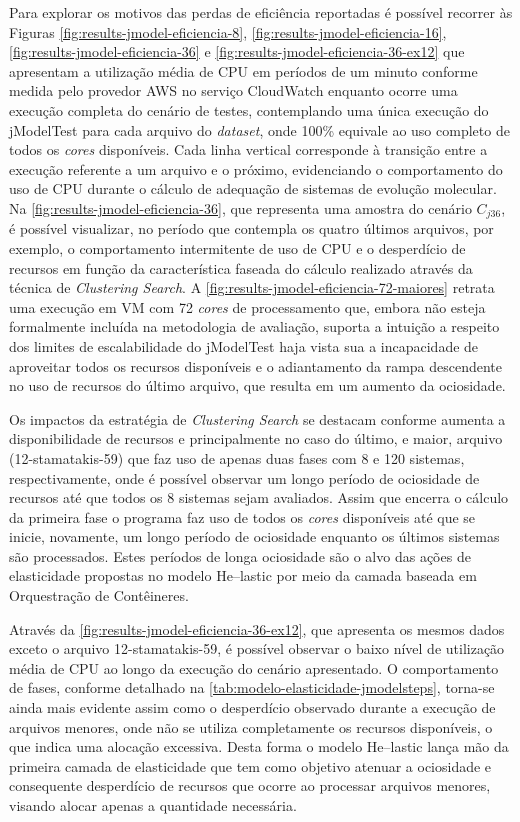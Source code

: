 \documentclass[english,brazilian]{UNISINOSmonografia} %
\begin{document}
Para explorar os motivos das perdas de eficiência reportadas é possível recorrer às Figuras \ref{fig:results-jmodel-eficiencia-8}, \ref{fig:results-jmodel-eficiencia-16}, \ref{fig:results-jmodel-eficiencia-36} e \ref{fig:results-jmodel-eficiencia-36-ex12} que
apresentam a utilização média de CPU em períodos de um minuto conforme medida pelo provedor AWS no serviço CloudWatch enquanto ocorre uma execução completa do cenário de testes, contemplando uma única execução do jModelTest para cada arquivo do \textit{dataset}, onde 100\% equivale ao uso completo de todos os \textit{cores} disponíveis.
%
Cada linha vertical corresponde à transição entre a execução referente a um arquivo e o próximo, evidenciando o comportamento do uso de CPU durante o cálculo de adequação de sistemas de evolução molecular.
%
Na \autoref{fig:results-jmodel-eficiencia-36}, que representa uma amostra do cenário $C_{j36}$, é possível visualizar, no período que contempla os quatro últimos arquivos, por exemplo, o comportamento intermitente de uso de CPU e o desperdício de recursos em função da característica faseada do cálculo realizado através da técnica de \textit{Clustering Search}.
%
A \autoref{fig:results-jmodel-eficiencia-72-maiores} retrata uma execução em VM com 72 \textit{cores} de processamento que, embora não esteja formalmente incluída na metodologia de avaliação, suporta a intuição a respeito dos limites de escalabilidade do jModelTest haja vista sua a incapacidade de aproveitar todos os recursos disponíveis e o adiantamento da rampa descendente no uso de recursos do último arquivo, que resulta em um aumento da ociosidade. 



Os impactos da estratégia de \textit{Clustering Search} se destacam conforme aumenta a disponibilidade de recursos e principalmente no caso do último, e maior, arquivo (12-stamatakis-59) que faz uso de apenas duas fases com 8 e 120 sistemas, respectivamente, onde é possível observar um longo período de ociosidade de recursos até que todos os 8 sistemas sejam avaliados.
%
Assim que encerra o cálculo da primeira fase o programa faz uso de todos os \textit{cores} disponíveis até que se inicie, novamente, um longo período de ociosidade enquanto os últimos sistemas são processados.
%
Estes períodos de longa ociosidade são o alvo das ações de elasticidade propostas no modelo \textsf{He}--lastic por meio da camada baseada em Orquestração de Contêineres.


Através da \autoref{fig:results-jmodel-eficiencia-36-ex12}, que apresenta os mesmos dados exceto o arquivo 12-stamatakis-59, é possível observar o baixo nível de utilização média de CPU ao longo da execução do cenário apresentado.
%
O comportamento de fases, conforme detalhado na \autoref{tab:modelo-elasticidade-jmodelsteps}, torna-se ainda mais evidente assim como o desperdício observado durante a execução de arquivos menores, onde não se utiliza completamente os recursos disponíveis, o que indica uma alocação excessiva.
%
Desta forma o modelo \textsf{He}--lastic lança mão da primeira camada de elasticidade que tem como objetivo atenuar a ociosidade e consequente desperdício de recursos que ocorre ao processar arquivos menores, visando alocar apenas a quantidade necessária.
\end{document}
